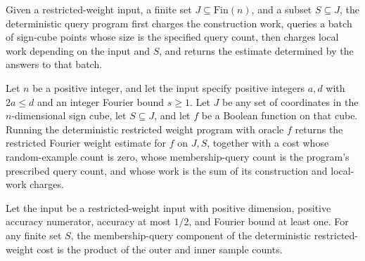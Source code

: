 \begin{definition}
\label{FABL.deterministicRestrictedWeightProgram}
\leanok
{}
Given a restricted-weight input, a finite set $J\subseteq\mathrm{Fin}(n)$, and a subset
$S\subseteq J$, the deterministic query program first charges the construction work,
queries a batch of sign-cube points whose size is the specified query count, then
charges local work depending on the input and $S$, and returns the estimate determined
by the answers to that batch.
\end{definition}

\begin{theorem}
\label{FABL.DeterministicQueryProgram.runWithCost_deterministicRestrictedWeightProgram}
\leanok
{}
Let $n$ be a positive integer, and let the input specify positive integers $a,d$ with
$2a\le d$ and an integer Fourier bound $s\ge1$. Let $J$ be any set of coordinates in the
$n$-dimensional sign cube, let $S\subseteq J$, and let $f$ be a Boolean function on that
cube. Running the deterministic restricted weight program with oracle $f$ returns the
restricted Fourier weight estimate for $f$ on $J,S$, together with a cost whose
random-example count is zero, whose membership-query count is the program's prescribed
query count, and whose work is the sum of its construction and local-work charges.
\end{theorem}

\begin{theorem}
\label{FABL.deterministicRestrictedWeightCost_queries}
\leanok
{}
Let the input be a restricted-weight input with positive dimension, positive accuracy
numerator, accuracy at most $1/2$, and Fourier bound at least one. For any finite set
$S$, the membership-query component of the deterministic restricted-weight cost is the
product of the outer and inner sample counts.
\end{theorem}

